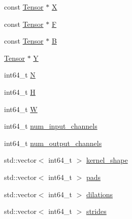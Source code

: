 \begin{DoxyCompactItemize}
\item 
const \mbox{\hyperlink{classonnxruntime_1_1Tensor}{Tensor}} $\ast$ \mbox{\hyperlink{structonnxruntime_1_1ConvTransposeBase_1_1Prepare_a0539db2c457342ff1bae007393152357}{X}}
\item 
const \mbox{\hyperlink{classonnxruntime_1_1Tensor}{Tensor}} $\ast$ \mbox{\hyperlink{structonnxruntime_1_1ConvTransposeBase_1_1Prepare_a8892b0b78c0d3cf5c96d20177546ba02}{F}}
\item 
const \mbox{\hyperlink{classonnxruntime_1_1Tensor}{Tensor}} $\ast$ \mbox{\hyperlink{structonnxruntime_1_1ConvTransposeBase_1_1Prepare_a143f9da8141e571b123b91ece78cafaa}{B}}
\item 
\mbox{\hyperlink{classonnxruntime_1_1Tensor}{Tensor}} $\ast$ \mbox{\hyperlink{structonnxruntime_1_1ConvTransposeBase_1_1Prepare_a923110bfea5225019739e47c5a102ef9}{Y}}
\item 
int64\+\_\+t \mbox{\hyperlink{structonnxruntime_1_1ConvTransposeBase_1_1Prepare_a1a97f6a2a2f386372e45a93652c88329}{N}}
\item 
int64\+\_\+t \mbox{\hyperlink{structonnxruntime_1_1ConvTransposeBase_1_1Prepare_ac3637cdbba4ac900aa28135a134bd5da}{H}}
\item 
int64\+\_\+t \mbox{\hyperlink{structonnxruntime_1_1ConvTransposeBase_1_1Prepare_a02349432a0120e2041cb954ba3477d37}{W}}
\item 
int64\+\_\+t \mbox{\hyperlink{structonnxruntime_1_1ConvTransposeBase_1_1Prepare_aa8843cd08d24d21d1896175c806780a7}{num\+\_\+input\+\_\+channels}}
\item 
int64\+\_\+t \mbox{\hyperlink{structonnxruntime_1_1ConvTransposeBase_1_1Prepare_ac865494efea1474b430f1c90d6d71176}{num\+\_\+output\+\_\+channels}}
\item 
std\+::vector$<$ int64\+\_\+t $>$ \mbox{\hyperlink{structonnxruntime_1_1ConvTransposeBase_1_1Prepare_a6690523708253655b89842ab012d7adb}{kernel\+\_\+shape}}
\item 
std\+::vector$<$ int64\+\_\+t $>$ \mbox{\hyperlink{structonnxruntime_1_1ConvTransposeBase_1_1Prepare_a61489fbec846a43544f297fdd24786e5}{pads}}
\item 
std\+::vector$<$ int64\+\_\+t $>$ \mbox{\hyperlink{structonnxruntime_1_1ConvTransposeBase_1_1Prepare_ad0d3fe2089862725cd0985dad54bb30e}{dilations}}
\item 
std\+::vector$<$ int64\+\_\+t $>$ \mbox{\hyperlink{structonnxruntime_1_1ConvTransposeBase_1_1Prepare_ab8f2eee471d10a5a2f484129cb9241d5}{strides}}
\end{DoxyCompactItemize}


